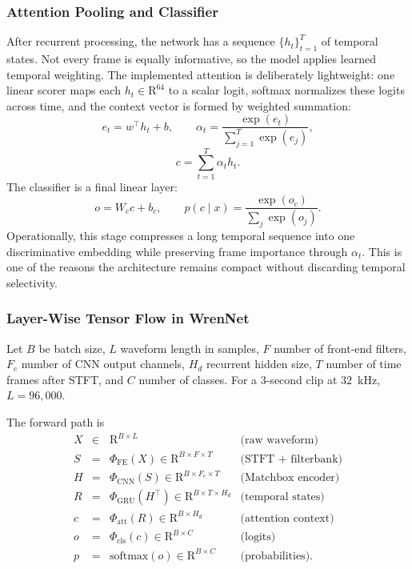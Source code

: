 \documentclass[a4paper,singleside,12pt]{report} %
\begin{document}
	\subsubsection{Attention Pooling and Classifier}
	After recurrent processing, the network has a sequence \(\{h_t\}_{t=1}^{T}\) of temporal states. Not every frame is equally informative, so the model applies learned temporal weighting. The implemented attention is deliberately lightweight: one linear scorer maps each \(h_t\in\mathrm{R}^{64}\) to a scalar logit, softmax normalizes these logits across time, and the context vector is formed by weighted summation:
	\begin{equation}
		e_t = w^\top h_t + b, \qquad
		\alpha_t = \frac{\exp(e_t)}{\sum_{j=1}^{T}\exp(e_j)},
	\end{equation}
	\begin{equation}
		c = \sum_{t=1}^{T}\alpha_t h_t.
	\end{equation}
	The classifier is a final linear layer:
	\begin{equation}
		o = W_c c + b_c, \qquad
		p(c \mid x)=\frac{\exp(o_c)}{\sum_j \exp(o_j)}.
	\end{equation}
	Operationally, this stage compresses a long temporal sequence into one discriminative embedding while preserving frame importance through \(\alpha_t\). This is one of the reasons the architecture remains compact without discarding temporal selectivity.

	\subsubsection{Layer-Wise Tensor Flow in WrenNet}
	Let \(B\) be batch size, \(L\) waveform length in samples, \(F\) number of front-end filters, \(F_c\) number of CNN output channels, \(H_d\) recurrent hidden size, \(T\) number of time frames after STFT, and \(C\) number of classes. For a \(3\)-second clip at \(32\)~kHz, \(L=96{,}000\).

	The forward path is
	\begin{equation}
		\begin{array}{rcll}
			X &\in& \mathrm{R}^{B\times L} & \mbox{(raw waveform)}\\
			S &=& \Phi_{\mathrm{FE}}(X) \in \mathrm{R}^{B\times F\times T} & \mbox{(STFT + filterbank)}\\
			H &=& \Phi_{\mathrm{CNN}}(S) \in \mathrm{R}^{B\times F_c\times T} & \mbox{(Matchbox encoder)}\\
			R &=& \Phi_{\mathrm{GRU}}\!\left(H^{\top}\right) \in \mathrm{R}^{B\times T\times H_d} & \mbox{(temporal states)}\\
			c &=& \Phi_{\mathrm{att}}(R) \in \mathrm{R}^{B\times H_d} & \mbox{(attention context)}\\
			o &=& \Phi_{\mathrm{cls}}(c) \in \mathrm{R}^{B\times C} & \mbox{(logits)}\\
			p &=& \mathrm{softmax}(o) \in \mathrm{R}^{B\times C} & \mbox{(probabilities).}
		\end{array}
	\end{equation}
\end{document}
